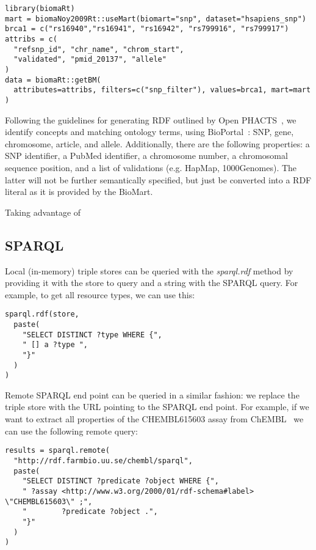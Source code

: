 \documentclass[12pt]{article}
\begin{document}
\begin{verbatim}
library(biomaRt)
mart = biomaNoy2009Rt::useMart(biomart="snp", dataset="hsapiens_snp")
brca1 = c("rs16940","rs16941", "rs16942", "rs799916", "rs799917")
attribs = c(
  "refsnp_id", "chr_name", "chrom_start",
  "validated", "pmid_20137", "allele"
)
data = biomaRt::getBM(
  attributes=attribs, filters=c("snp_filter"), values=brca1, mart=mart
)
\end{verbatim}

Following the guidelines for generating RDF outlined by Open PHACTS~\cite{Haupt2013,Williams2012}, we identify concepts
and matching ontology terms, using BioPortal~\cite{Noy2009}: SNP, gene, chromosome,
article, and allele. Additionally, there are the following properties: a SNP identifier, a PubMed identifier,
a chromosome number, a chromosomal sequence position, and a list of validations (e.g. HapMap, 1000Genomes).
The latter will not be further semantically specified, but just be converted into a RDF literal as it is
provided by the BioMart.

Taking advantage of 

\subsection{SPARQL}

Local (in-memory) triple stores can be queried with the \emph{sparql.rdf} method by providing
it with the store to query and a string with the SPARQL query. For example, to get all resource
types, we can use this:

\begin{verbatim}
sparql.rdf(store,
  paste(
    "SELECT DISTINCT ?type WHERE {",
    " [] a ?type ",
    "}"
  )
) 
\end{verbatim}

Remote SPARQL end point can be queried in a similar fashion: we replace the triple store with the
URL pointing to the SPARQL end point. For example, if we want to
extract all properties of the CHEMBL615603 assay from ChEMBL~\cite{Gaulton2012,Willighagen2013}
we can use the following remote query:

\begin{verbatim}
results = sparql.remote(
  "http://rdf.farmbio.uu.se/chembl/sparql",
  paste(
    "SELECT DISTINCT ?predicate ?object WHERE {",
    " ?assay <http://www.w3.org/2000/01/rdf-schema#label> \"CHEMBL615603\" ;",
    "        ?predicate ?object .",
    "}"
  )
) 
\end{verbatim}
\end{document}
